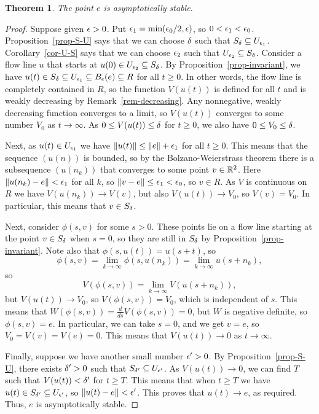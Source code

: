 \documentclass[reqno]{amsart}
\newtheorem{theorem}{Theorem}
\theoremstyle{definition}
\begin{document}
\begin{theorem}
 The point $e$ is asymptotically stable.
\end{theorem}
\begin{proof}
 Suppose given $\epsilon>0$.  Put $\epsilon_1=\min(\epsilon_0/2,\epsilon)$, so
 $0<\epsilon_1<\epsilon_0$.  Proposition~\ref{prop-S-U} says that we can choose
 $\delta$ such that $S_\delta\subseteq U_{\epsilon_1}$.  Corollary~\ref{cor-U-S}
 says that we can choose $\epsilon_2$ such that $U_{\epsilon_2}\subseteq S_\delta$.
 Consider a flow line $u$ that starts at
 $u(0)\in U_{\epsilon_2}\subseteq S_{\delta}$.  By
 Proposition~\ref{prop-invariant}, we have
 $u(t)\in S_\delta\subseteq U_{\epsilon_1}\subseteq B_{\epsilon}(e)\subseteq R$ for all
 $t\geq 0$.  In other words, the flow line is completely contained in
 $R$, so the function $V(u(t))$ is defined for all $t$ and is weakly
 decreasing by Remark~\ref{rem-decreasing}.  Any nonnegative, weakly
 decreasing function converges to a limit, so $V(u(t))$ converges to
 some number $V_0$ as $t\to\infty$.  As $0\leq V(u(t))\leq\delta$ for
 $t\geq 0$, we also have $0\leq V_0\leq \delta$.

 Next, as $u(t)\in U_{\epsilon_1}$ we have $\|u(t)\|\leq \|e\|+\epsilon_1$ for
 all $t\geq 0$.  This means that the sequence $(u(n))$ is bounded, so
 by the Bolzano-Weierstrass theorem there is a subsequence $(u(n_k))$
 that converges to some point $v\in{\mathbb{R}}^2$.  Here $\|u(n_k)-e\|<\epsilon_1$
 for all $k$, so $\|v-e\|\leq\epsilon_1<\epsilon_0$, so $v\in R$.  As $V$ is
 continuous on $R$ we have $V(u(n_k))\to V(v)$, but also
 $V(u(t))\to V_0$, so $V(v)=V_0$.  In particular, this means that
 $v\in S_\delta$.

 Next, consider $\phi(s,v)$ for some $s>0$.  These points lie on a
 flow line starting at the point $v\in S_\delta$ when $s=0$, so they are
 still in $S_\delta$ by Proposition~\ref{prop-invariant}.  Note also that
 $\phi(s,u(t))=u(s+t)$, so 
 \[ \phi(s,v) = \lim_{k\to\infty} \phi(s,u(n_k)) = 
     \lim_{k\to\infty} u(s+n_k),
 \]
 so 
 \[ V(\phi(s,v))=\lim_{k\to\infty}V(u(s+n_k)), \]
 but $V(u(t))\to V_0$, so $V(\phi(s,v))=V_0$, which is independent of
 $s$.  This means that $W(\phi(s,v))=\frac{d}{ds}V(\phi(s,v))=0$, but
 $W$ is negative definite, so $\phi(s,v)=e$.  In particular, we can
 take $s=0$, and we get $v=e$, so $V_0=V(v)=V(e)=0$.  This means
 that $V(u(t))\to 0$ as $t\to\infty$.

 Finally, suppose we have another small number $\epsilon'>0$.  By
 Proposition~\ref{prop-S-U}, there exists $\delta'>0$ such that
 $S_{\delta'}\subseteq U_{\epsilon'}$.  As $V(u(t))\to 0$, we can find $T$ such
 that $V(u(t))<\delta'$ for $t\geq T$.  This means that when $t\geq T$ we
 have $u(t)\in S_{\delta'}\subseteq U_{\epsilon'}$, so $\|u(t)-e\|<\epsilon'$.  This
 proves that $u(t)\to e$, as required.  Thus, $e$ is asymptotically
 stable. 
\end{proof}
\end{document}
